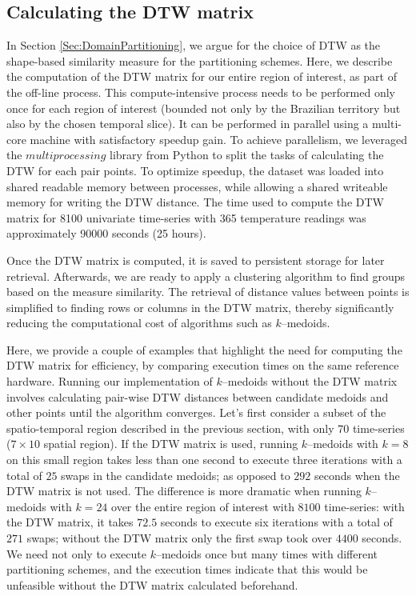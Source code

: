 \subsection{Calculating the DTW matrix}
In Section \ref{Sec:DomainPartitioning}, we argue for the choice of DTW as the shape-based similarity measure for the partitioning schemes. Here, we describe the computation of the DTW matrix for our entire region of interest, as part of the off-line process. This compute-intensive process needs to be performed only once for each region of interest (bounded not only by the Brazilian territory but also by the chosen temporal slice). It can be performed in parallel using a multi-core machine with satisfactory speedup gain. To achieve parallelism, we leveraged the $multiprocessing$ library from Python to split the tasks of calculating the DTW for each pair points. To optimize speedup, the dataset was loaded into shared readable memory between processes, while allowing a shared writeable memory for writing the DTW distance. The time used to compute the DTW matrix for 8100 univariate time-series with 365 temperature readings was approximately 90000 seconds (25 hours).

Once the DTW matrix is computed, it is saved to persistent storage for later retrieval. Afterwards, we are ready to apply a clustering algorithm to find groups based on the measure similarity. 
The retrieval of distance values between points is simplified to finding rows or columns in the DTW matrix, thereby significantly reducing the computational cost of algorithms such as $k$--medoids.

Here, we provide a couple of examples that highlight the need for computing the DTW matrix for efficiency, by comparing execution times on the same reference hardware. Running our implementation of $k$--medoids without the DTW matrix involves calculating pair-wise DTW distances between candidate medoids and other points until the algorithm converges. Let's first consider a subset of the spatio-temporal region described in the previous section, with only $70$ time-series ($7 \times 10$ spatial region). If the DTW matrix is used, running $k$--medoids with $k=8$ on this small region takes less than one second to execute three iterations with a total of $25$ swaps in the candidate medoids; as opposed to $292$ seconds when the DTW matrix is not used. The difference is more dramatic when running $k$--medoids with $k=24$ over the entire region of interest with $8100$ time-series: with the DTW matrix, it  takes $72.5$ seconds to execute six iterations with a total of $271$ swaps; without the DTW matrix only the first swap took over $4400$ seconds. We need not only to execute $k$--medoids once but many times with different partitioning schemes, and the execution times indicate that this would be unfeasible without the DTW matrix calculated beforehand.

